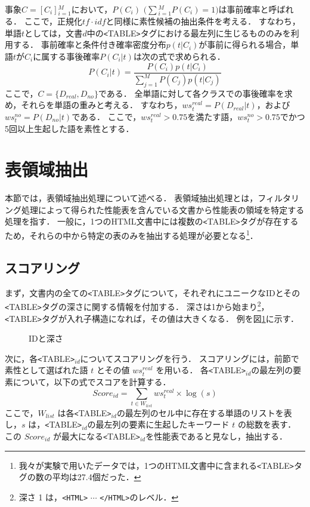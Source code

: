\begin{description}
事象$C={[C_{i}]}${\footnotesize $_{i=1}^M$}において，$P(C_{i})$ $(\sum${\footnotesize $^{M}_{i=1}$}$P(C_{i})=1)$は事前確率と呼ばれる．
ここで，正規化$tf \cdot idf$と同様に素性候補の抽出条件を考える．
すなわち，単語$t$としては，文書$d$中の\verb+<+TABLE\verb+>+タグにおける最左列に生じるもののみを利用する．
事前確率と条件付き確率密度分布$p(t|C_i)$が事前に得られる場合，単語$t$が$C_i$に属する事後確率$P(C_i|t)$は次の式で求められる．
\begin{equation}
P(C_i|t) = \frac{P(C_i)p(t|C_i)}{\sum^M_{j=1}P(C_j)p(t|C_j)}
\end{equation}
ここで，$C=\{D_{real}, D_{no}\}$である．
全単語に対して各クラスでの事後確率を求め，それらを単語の重みと考える．
すなわち，$ws_t^{real}=P(D_{real}|t)$，および$ws_t^{no}=P(D_{no}|t)$である．
ここで，$ws_t^{real}>0.75$を満たす語，$ws_t^{no}>0.75$でかつ5回以上生起した語を素性とする．
\end{description}

\section{表領域抽出}
本節では，表領域抽出処理について述べる．
表領域抽出処理とは，フィルタリング処理によって得られた性能表を含んでいる文書から性能表の領域を特定する処理を指す．
一般に，1つのHTML文書中には複数の\verb+<+TABLE\verb+>+タグが存在するため，それらの中から特定の表のみを抽出する処理が必要となる\footnote{我々が実験で用いたデータでは，1つのHTML文書中に含まれる\verb+<+TABLE\verb+>+タグの数の平均は27.4個だった．}．

\subsection{スコアリング}
まず，文書内の全ての\verb+<+TABLE\verb+>+タグについて，それぞれにユニークなIDとその\verb+<+TABLE\verb+>+タグの深さに関する情報を付加する．
深さは1から始まり\footnote{深さ 1 は，\verb+<HTML>+ $\cdots$ \verb+</HTML>+のレベル．}，\verb+<+TABLE\verb+>+タグが入れ子構造になれば，その値は大きくなる．
例を図\ref{numbering}に示す．

\begin{figure}
\begin{center}
\end{center}
\vspace{-3mm}
\caption{IDと深さ}
\label{numbering}
\end{figure}

次に，各\verb+<+TABLE\verb+>+$_{id}$についてスコアリングを行う．
スコアリングには，前節で素性として選ばれた語 $t$ とその値 $ws^{real}_t$ を用いる．
各\verb+<+TABLE\verb+>+$_{id}$の最左列の要素について，以下の式でスコアを計算する．
\begin{equation}
Score_{id}=\sum_{t \in W_{list}}ws^{real}_t \times \log(s)
\end{equation}
ここで，$W_{list}$ は各\verb+<+TABLE\verb+>+$_{id}$の最左列のセル中に存在する単語のリストを表し，$s$ は，\verb+<+TABLE\verb+>+$_{id}$の最左列の要素に生起したキーワード $t$ の総数を表す．
この $Score_{id}$ が最大になる\verb+<+TABLE\verb+>+$_{id}$を性能表であると見なし，抽出する．

